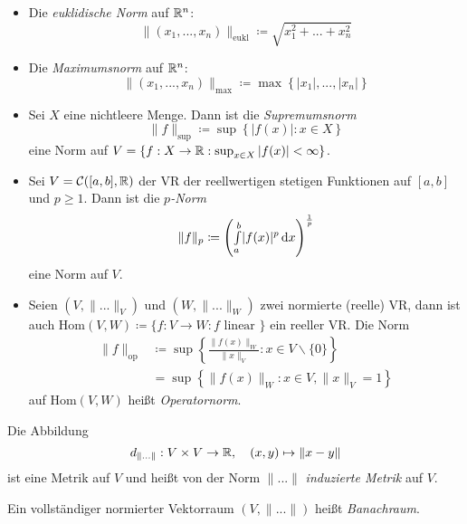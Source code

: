 \documentclass{cheat-sheet}
\begin{document}
\begin{bem}
\begin{itemize}
  \item Die \emph{euklidische Norm} auf $\mathbb{R}^n$:
  \[ \| (x_1, ..., x_n) \|_{\text{eukl}} \coloneqq \sqrt{x_1^2 + ... + x_n^2} \]
  \item Die \emph{Maximumsnorm} auf $\mathbb{R}^n$:
  \[ \| (x_1, ..., x_n) \|_{\text{max}} \coloneqq \max\left\{ |x_1|, ..., |x_n| \right\} \]
  \item Sei $X$ eine nichtleere Menge. Dann ist die \emph{Supremumsnorm}
  \[ \| f \|_{\text{sup}} \coloneqq \sup\left\{ |f(x)| : x \in X \right\} \]
  eine Norm auf $V = \left\{ f : X \to \mathbb{R} : \sup_{x \in X} |f(x)| < \infty \right\}$.
  \item Sei $V = \mathcal{C}([a, b], \mathbb{R})$ der VR der reellwertigen stetigen Funktionen auf $[a, b]$ und $p \ge 1$. Dann ist die \emph{$p$-Norm}
  \[ \|f\|_{p} \coloneqq \left( {\textstyle \int\limits_{a}^{b}} |f(x)|^p \,\mathrm{d} x \right)^{\frac{1}{p}} \]
  eine Norm auf $V$.
  \item Seien $(V, \| ... \|_V)$ und $(W, \| ... \|_W)$ zwei normierte (reelle) VR, dann ist auch $\mathrm{Hom}(V, W) \coloneqq \{ f : V \to W : f \text{ linear } \}$ ein reeller VR. Die Norm
  \begin{align*}
    \|f\|_{\text{op}} &\coloneqq \sup\left\{ \frac{ \| f(x) \|_W }{ \| x \|_V } : x \in V \backslash \{ 0 \} \right\}\\
      &= \sup \left\{ \| f(x) \|_W : x \in V, \| x \|_V = 1 \right\}
  \end{align*}
  auf $\mathrm{Hom}(V, W)$ heißt \emph{Operatornorm}.
\end{itemize}
\end{bem}


\begin{defn}
Die Abbildung
\[ d_{\| ... \|} : V \times V \to \mathbb{R},\quad (x, y) \mapsto \| x - y \| \]
ist eine Metrik auf $V$ und heißt von der Norm $\| ... \|$ \emph{induzierte Metrik} auf $V$.
\end{defn}

\begin{defn}
Ein vollständiger normierter Vektorraum $(V, \| ... \|)$ heißt \emph{Banachraum}.
\end{defn}
\end{document}
